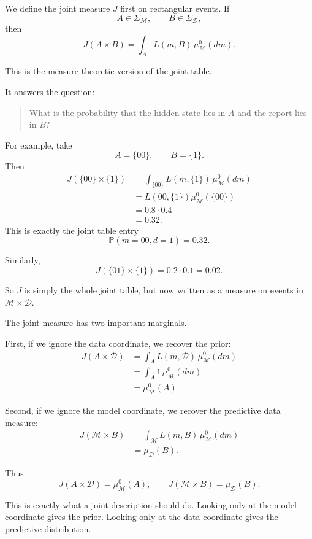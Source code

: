 \documentclass[11pt]{article}
\newcommand{\M}{\mathcal{M}}
\newcommand{\D}{\mathcal{D}}
\newcommand{\SigmaM}{\Sigma_{\M}}
\newcommand{\SigmaD}{\Sigma_{\D}}
\newcommand{\muMzero}{\mu^0_{\M}}
\newcommand{\muD}{\mu_{\D}}
\begin{document}
We define the joint measure \(J\) first on rectangular events. If
\[
    A\in\SigmaM,
    \qquad
    B\in\SigmaD,
\]
then
\[
    J(A\times B)
    =
    \int_A L(m,B)\,\muMzero(dm).
\]

This is the measure-theoretic version of the joint table.

It answers the question:

\begin{quote}
    What is the probability that the hidden state lies in \(A\) and the report lies in \(B\)?
\end{quote}

For example, take
\[
    A=\{00\},
    \qquad
    B=\{1\}.
\]
Then
\[
\begin{aligned}
    J(\{00\}\times\{1\})
    &=
    \int_{\{00\}} L(m,\{1\})\,\muMzero(dm)
    \\
    &=
    L(00,\{1\})\muMzero(\{00\})
    \\
    &=
    0.8\cdot 0.4
    \\
    &=
    0.32.
\end{aligned}
\]
This is exactly the joint table entry
\[
    \mathbb{P}(m=00,d=1)=0.32.
\]

Similarly,
\[
    J(\{01\}\times\{1\})
    =
    0.2\cdot 0.1
    =
    0.02.
\]

So \(J\) is simply the whole joint table, but now written as a measure on events in \(\M\times\D\).

The joint measure has two important marginals.

First, if we ignore the data coordinate, we recover the prior:
\[
\begin{aligned}
    J(A\times \D)
    &=
    \int_A L(m,\D)\,\muMzero(dm)
    \\
    &=
    \int_A 1\,\muMzero(dm)
    \\
    &=
    \muMzero(A).
\end{aligned}
\]

Second, if we ignore the model coordinate, we recover the predictive data measure:
\[
\begin{aligned}
    J(\M\times B)
    &=
    \int_{\M} L(m,B)\,\muMzero(dm)
    \\
    &=
    \muD(B).
\end{aligned}
\]

Thus
\[
    J(A\times \D)=\muMzero(A),
    \qquad
    J(\M\times B)=\muD(B).
\]

This is exactly what a joint description should do. Looking only at the model coordinate gives the prior. Looking only at the data coordinate gives the predictive distribution.
\end{document}
